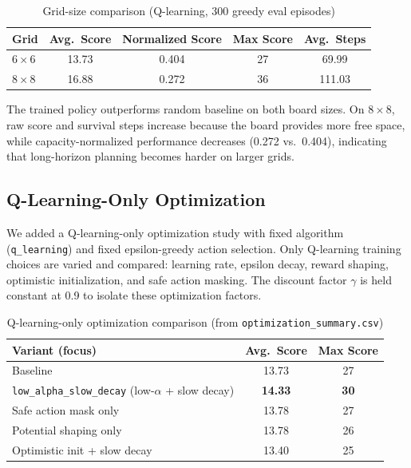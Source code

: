 \documentclass[10pt,conference]{IEEEtran}
\begin{document}
\begin{table}[h]
  \centering
  \caption{Grid-size comparison (Q-learning, 300 greedy eval episodes)}
  \label{tab:grid_size_comparison}
  \begin{tabular}{lcccc}
    \toprule
    Grid & Avg.\ Score & Normalized Score & Max Score & Avg.\ Steps \\
    \midrule
    $6{\times}6$ & 13.73 & 0.404 & 27 & 69.99 \\
    $8{\times}8$ & 16.88 & 0.272 & 36 & 111.03 \\
    \bottomrule
  \end{tabular}
\end{table}

The trained policy outperforms random baseline on both board sizes.
On $8{\times}8$, raw score and survival steps increase because the board
provides more free space, while capacity-normalized performance
decreases (0.272 vs.\ 0.404), indicating that long-horizon planning
becomes harder on larger grids.

\subsection{Q-Learning-Only Optimization}

We added a Q-learning-only optimization study with fixed algorithm
(\texttt{q\_learning}) and fixed epsilon-greedy action selection.
Only Q-learning training choices are varied and compared:
learning rate, epsilon decay, reward shaping, optimistic
initialization, and safe action masking. The discount factor
$\gamma$ is held constant at 0.9 to isolate these optimization factors.

\begin{table}[h]
  \centering
  \caption{Q-learning-only optimization comparison (from \texttt{optimization\_summary.csv})}
  \label{tab:q_learning_optimization}
  \begin{tabular}{lcc}
    \toprule
    Variant (focus) & Avg.\ Score & Max Score \\
    \midrule
    Baseline & 13.73 & 27 \\
    \texttt{low\_alpha\_slow\_decay} (low-$\alpha$ + slow decay) & \textbf{14.33} & \textbf{30} \\
    Safe action mask only & 13.78 & 27 \\
    Potential shaping only & 13.78 & 26 \\
    Optimistic init + slow decay & 13.40 & 25 \\
    \bottomrule
  \end{tabular}
\end{table}
\end{document}
